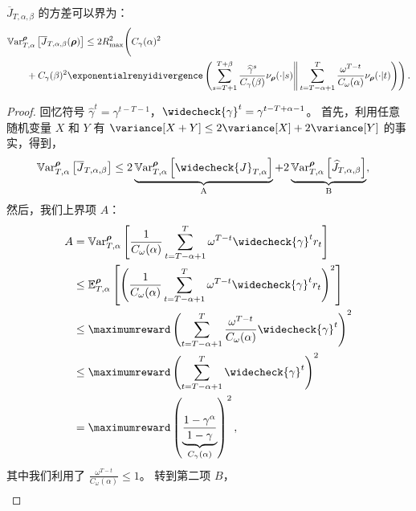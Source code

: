 \begin{lemma}
\label{lem:variance_bound}
$\overline{J}_{T,\alpha,\beta}$ 的方差可以界为：
\begin{align*}
    &\mathbb{V}\mathrm{ar}^{\boldsymbol\rho}_{T,\alpha}\left[\overline{J}_{T,\alpha,\beta}(\boldsymbol\rho)\right]
    \leq
    2 R_{\max}^{2} \Bigg(C_\gamma(\alpha)^2 \\
    &\qquad + C_\gamma(\beta)^2 \exponentialrenyidivergence \left(  \sum_{s=T+1}^{T+\beta} \frac{\widehat{\gamma}^s}{C_\gamma(\beta)} \nu_{\boldsymbol\rho}(\cdot\vert s)  \Bigg\Vert     \sum_{t=T-\alpha+1}^{T} \frac{\omega^{T-t} }{C_\omega(\alpha)}\nu_{\boldsymbol\rho}(\cdot\vert t)  \Bigg) \right).
\end{align*}
\end{lemma}
\begin{proof}
    回忆符号 $\widehat{\gamma}^t=\gamma^{t-T-1}$，$\widecheck{\gamma}^t= \gamma^{t-T+\alpha-1}$。
    首先，利用任意随机变量 $X$ 和 $Y$ 有 $\variance[X+Y] \le 2\variance[X]+2\variance[Y]$ 的事实，得到，
\begin{align}
    \mathbb{V}\mathrm{ar}^{\boldsymbol\rho}_{T,\alpha} \left[\overline{J}_{T,\alpha,\beta}\right]
    &\leq 2\underbrace{\mathbb{V}\mathrm{ar}^{\boldsymbol\rho}_{T,\alpha} \left[\widecheck{J}_{T,\alpha}\right]}_{\text{A}} + 2\underbrace{\mathbb{V}\mathrm{ar}^{\boldsymbol\rho}_{T,\alpha} \left[\widehat{J}_{T,\alpha,\beta}\right]}_{\text{B}} \nonumber,
\end{align}
然后，我们上界项 $A$：
\begin{align*}
    A
    &= \mathbb{V}\mathrm{ar}^{\boldsymbol\rho}_{T,\alpha} \left[ \frac{1}{C_\omega(\alpha)} \sum_{t=T-\alpha+1}^{T} \omega^{T-t} \widecheck{\gamma}^t r_t \right] \\
    & \le \mathbb{E}^{\boldsymbol\rho}_{T,\alpha} \left[ \left(\frac{1}{C_\omega(\alpha)} \sum_{t=T-\alpha+1}^{T} \omega^{T-t} \widecheck{\gamma}^t r_t\right)^2 \right] \\
    & \le \maximumreward  \left(\sum_{t=T-\alpha+1}^{T} \frac{\omega^{T-t}}{C_\omega(\alpha)} \widecheck{\gamma}^t\right)^2 \\
    &\le  \maximumreward  \left(\sum_{t=T-\alpha+1}^{T}  \widecheck{\gamma}^t \right)^2
    \\
    &= \maximumreward \left( \underbrace{\frac{1-\gamma^\alpha}{1-\gamma}}_{C_\gamma(\alpha)}\right)^2,
\end{align*}
其中我们利用了 $\frac{\omega^{T-t}}{C_\omega(\alpha)} \le 1$。
转到第二项 $B$，
\begin{align}

\end{align}
\end{proof}
